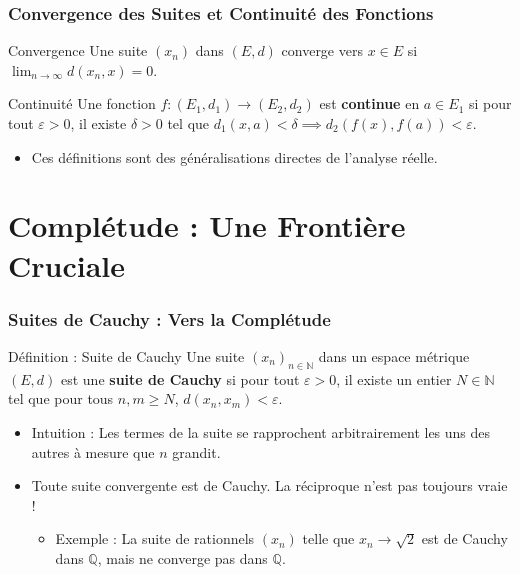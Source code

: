 \documentclass{beamer}
\begin{document}
\begin{frame}
    \frametitle{Convergence des Suites et Continuité des Fonctions}
    \begin{block}{Convergence}
        Une suite $(x_n)$ dans $(E, d)$ converge vers $x \in E$ si $\lim_{n \to \infty} d(x_n, x) = 0$.
    \end{block}
    \begin{block}{Continuité}
        Une fonction $f : (E_1, d_1) \to (E_2, d_2)$ est \textbf{continue} en $a \in E_1$ si pour tout $\varepsilon > 0$, il existe $\delta > 0$ tel que $d_1(x, a) < \delta \implies d_2(f(x), f(a)) < \varepsilon$.
    \end{block}
    \begin{itemize}
        \item Ces définitions sont des généralisations directes de l'analyse réelle.
    \end{itemize}
\end{frame}

\section*{Complétude : Une Frontière Cruciale}
\begin{frame}
    \frametitle{Suites de Cauchy : Vers la Complétude}
    \begin{block}{Définition : Suite de Cauchy}
        Une suite $(x_n)_{n \in \mathbb{N}}$ dans un espace métrique $(E, d)$ est une \textbf{suite de Cauchy} si pour tout $\varepsilon > 0$, il existe un entier $N \in \mathbb{N}$ tel que pour tous $n, m \ge N$, $d(x_n, x_m) < \varepsilon$.
    \end{block}
    \begin{itemize}
        \item Intuition : Les termes de la suite se rapprochent arbitrairement les uns des autres à mesure que $n$ grandit.
        \item Toute suite convergente est de Cauchy. La réciproque n'est pas toujours vraie !
            \begin{itemize}
                \item Exemple : La suite de rationnels $(x_n)$ telle que $x_n \to \sqrt{2}$ est de Cauchy dans $\mathbb{Q}$, mais ne converge pas dans $\mathbb{Q}$.
            \end{itemize}
    \end{itemize}
\end{frame}
\end{document}
